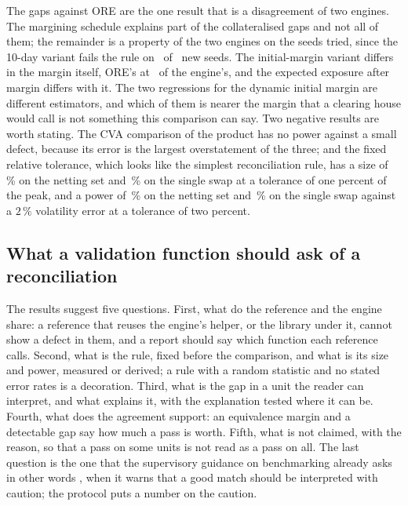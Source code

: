 The gaps against ORE are the one result that is a disagreement of two engines. The margining schedule explains part of the collateralised gaps and not all of them; the remainder is a property of the two engines on the seeds tried, since the 10-day variant fails the rule on \nReplCsaFail\ of \nReplCsaN\ new seeds. The initial-margin variant differs in the margin itself, ORE's at \nImRatio\ of the engine's, and the expected exposure after margin differs with it. The two regressions for the dynamic initial margin are different estimators, and which of them is nearer the margin that a clearing house would call is not something this comparison can say. Two negative results are worth stating. The CVA comparison of the product has no power against a small defect, because its error is the largest overstatement of the three; and the fixed relative tolerance, which looks like the simplest reconciliation rule, has a size of \nSizeFixedOneNetting\,\% on the netting set and \nSizeFixedOneSingle\,\% on the single swap at a tolerance of one percent of the peak, and a power of \nPowerFixedTwoSigmaTwo\,\% on the netting set and \nPowerFixedTwoSigmaTwoSingle\,\% on the single swap against a $2\,\%$ volatility error at a tolerance of two percent.

\subsection{What a validation function should ask of a reconciliation}
\label{sec:discussion-ask}

The results suggest five questions. First, what do the reference and the engine share: a reference that reuses the engine's helper, or the library under it, cannot show a defect in them, and a report should say which function each reference calls. Second, what is the rule, fixed before the comparison, and what is its size and power, measured or derived; a rule with a random statistic and no stated error rates is a decoration. Third, what is the gap in a unit the reader can interpret, and what explains it, with the explanation tested where it can be. Fourth, what does the agreement support: an equivalence margin and a detectable gap say how much a pass is worth. Fifth, what is not claimed, with the reason, so that a pass on some units is not read as a pass on all. The last question is the one that the supervisory guidance on benchmarking already asks in other words \citep{fed2011sr117}, when it warns that a good match should be interpreted with caution; the protocol puts a number on the caution.
